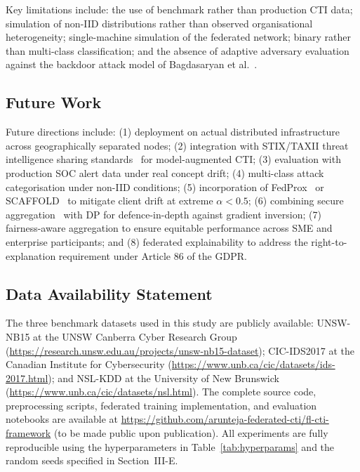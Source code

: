 \documentclass[conference]{IEEEtran}
\begin{document}
Key limitations include: the use of benchmark rather than production
CTI data; simulation of non-IID distributions rather than observed
organisational heterogeneity; single-machine simulation of the
federated network; binary rather than multi-class classification;
and the absence of adaptive adversary evaluation against the
backdoor attack model of Bagdasaryan et al.~\cite{bagdasaryan2020}.

\subsection{Future Work}

Future directions include:
(1) deployment on actual distributed infrastructure across
geographically separated nodes;
(2) integration with STIX/TAXII threat intelligence sharing
standards~\cite{barnum2012} for model-augmented CTI;
(3) evaluation with production SOC alert data under real concept drift;
(4) multi-class attack categorisation under non-IID conditions;
(5) incorporation of FedProx~\cite{li2020fedprox} or
SCAFFOLD~\cite{karimireddy2020scaffold} to mitigate client drift at
extreme $\alpha < 0.5$;
(6) combining secure aggregation~\cite{bonawitz2017} with DP for
defence-in-depth against gradient inversion;
(7) fairness-aware aggregation to ensure equitable performance across
SME and enterprise participants; and
(8) federated explainability to address the right-to-explanation
requirement under Article 86 of the GDPR.

\subsection{Data Availability Statement}

The three benchmark datasets used in this study are publicly available:
UNSW-NB15 at the UNSW Canberra Cyber Research Group
(\url{https://research.unsw.edu.au/projects/unsw-nb15-dataset});
CIC-IDS2017 at the Canadian Institute for Cybersecurity
(\url{https://www.unb.ca/cic/datasets/ids-2017.html});
and NSL-KDD at the University of New Brunswick
(\url{https://www.unb.ca/cic/datasets/nsl.html}).
The complete source code, preprocessing scripts, federated training
implementation, and evaluation notebooks are available at
\url{https://github.com/arunteja-federated-cti/fl-cti-framework}
(to be made public upon publication).
All experiments are fully reproducible using the hyperparameters in
Table~\ref{tab:hyperparams} and the random seeds specified in
Section~III-E.



\end{document}
